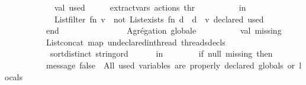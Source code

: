 \begin{isabellebody}
\ \ \ \ \ \ \ \ \ \ \ \ val\ used\ \ \ \ \ {\isacharequal}{\kern0pt}\ extract{\isacharunderscore}{\kern0pt}vars\ {\isacharparenleft}{\kern0pt}{\isacharhash}{\kern0pt}actions\ thr{\isacharparenright}{\kern0pt}\isanewline
\ \ \ \ \ \ \ \ \ \ in\isanewline
\ \ \ \ \ \ \ \ \ \ \ \ List{\isachardot}{\kern0pt}filter\ {\isacharparenleft}{\kern0pt}fn\ v\ {\isacharequal}{\kern0pt}{\isachargreater}{\kern0pt}\ not\ {\isacharparenleft}{\kern0pt}List{\isachardot}{\kern0pt}exists\ {\isacharparenleft}{\kern0pt}fn\ d\ {\isacharequal}{\kern0pt}{\isachargreater}{\kern0pt}\ d\ {\isacharequal}{\kern0pt}\ v{\isacharparenright}{\kern0pt}\ declared{\isacharparenright}{\kern0pt}{\isacharparenright}{\kern0pt}\ used\isanewline
\ \ \ \ \ \ \ \ \ \ end\isanewline
\ \ \ \ \isanewline
\ \ \ \ \ \ \ \ {\isacharparenleft}{\kern0pt}{\isacharasterisk}{\kern0pt}\ {\isacharminus}{\kern0pt}{\isacharminus}{\kern0pt}{\isacharminus}{\kern0pt}{\isacharminus}{\kern0pt}{\isacharminus}{\kern0pt}{\isacharminus}{\kern0pt}{\isacharminus}{\kern0pt}{\isacharminus}{\kern0pt}{\isacharminus}{\kern0pt}{\isacharminus}{\kern0pt}{\isacharminus}{\kern0pt}{\isacharminus}{\kern0pt}{\isacharminus}{\kern0pt}{\isacharminus}{\kern0pt}{\isacharminus}{\kern0pt}{\isacharminus}{\kern0pt}{\isacharminus}{\kern0pt}{\isacharminus}{\kern0pt}\ {}{\isachardot}{\kern0pt}\ Agrégation\ globale\ {\isacharminus}{\kern0pt}{\isacharminus}{\kern0pt}{\isacharminus}{\kern0pt}{\isacharminus}{\kern0pt}{\isacharminus}{\kern0pt}{\isacharminus}{\kern0pt}{\isacharminus}{\kern0pt}{\isacharminus}{\kern0pt}{\isacharminus}{\kern0pt}{\isacharminus}{\kern0pt}{\isacharminus}{\kern0pt}{\isacharminus}{\kern0pt}{\isacharminus}{\kern0pt}{\isacharminus}{\kern0pt}{\isacharminus}{\kern0pt}{\isacharminus}{\kern0pt}{\isacharminus}{\kern0pt}{\isacharminus}{\kern0pt}{\isacharminus}{\kern0pt}{\isacharminus}{\kern0pt}{\isacharminus}{\kern0pt}{\isacharminus}{\kern0pt}{\isacharminus}{\kern0pt}\ {\isacharasterisk}{\kern0pt}{\isacharparenright}{\kern0pt}\isanewline
\ \ \ \ \ \ \ \ val\ missing\ {\isacharequal}{\kern0pt}\isanewline
\ \ \ \ \ \ \ \ \ \ List{\isachardot}{\kern0pt}concat\ {\isacharparenleft}{\kern0pt}map\ undeclared{\isacharunderscore}{\kern0pt}in{\isacharunderscore}{\kern0pt}thread\ threads{\isacharunderscore}{\kern0pt}decls{\isacharparenright}{\kern0pt}\isanewline
\ \ \ \ \ \ \ \ \ \ {\isacharbar}{\kern0pt}{\isachargreater}{\kern0pt}\ sort{\isacharunderscore}{\kern0pt}distinct\ string{\isacharunderscore}{\kern0pt}ord\isanewline
\ \ \ \ \ \ in\isanewline
\ \ \ \ \ \ \ \ if\ null\ missing\ then\isanewline
\ \ \ \ \ \ \ \ \ \ message\ false\ {\isachardoublequote}{\kern0pt}{\isasymcheckmark}\ All\ used\ variables\ are\ properly\ declared\ {\isacharparenleft}{\kern0pt}globals\ or\ locals{\isacharparenright}{\kern0pt}{\isachardoublequote}{\kern0pt}\isanewline

\end{isabellebody}
